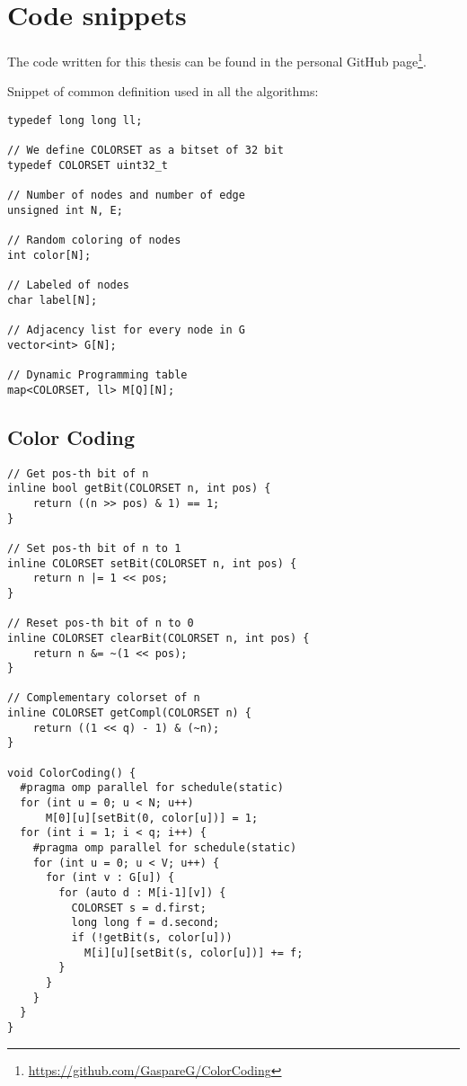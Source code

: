 

\chapter{Code snippets}
  
The code written for this thesis can be found in the personal GitHub page\footnote{\url{https://github.com/GaspareG/ColorCoding}}.\medskip

Snippet of common definition used in all the algorithms:

\begin{lstlisting}
typedef long long ll;

// We define COLORSET as a bitset of 32 bit
typedef COLORSET uint32_t

// Number of nodes and number of edge
unsigned int N, E;

// Random coloring of nodes
int color[N];

// Labeled of nodes
char label[N];

// Adjacency list for every node in G
vector<int> G[N];

// Dynamic Programming table
map<COLORSET, ll> M[Q][N];
\end{lstlisting}

\clearpage


\section*{Color Coding}

\begin{lstlisting}
// Get pos-th bit of n
inline bool getBit(COLORSET n, int pos) { 
	return ((n >> pos) & 1) == 1; 
}

// Set pos-th bit of n to 1
inline COLORSET setBit(COLORSET n, int pos) { 
	return n |= 1 << pos; 
}

// Reset pos-th bit of n to 0
inline COLORSET clearBit(COLORSET n, int pos) { 
	return n &= ~(1 << pos); 
}

// Complementary colorset of n
inline COLORSET getCompl(COLORSET n) { 
	return ((1 << q) - 1) & (~n); 
}

void ColorCoding() {
  #pragma omp parallel for schedule(static)
  for (int u = 0; u < N; u++) 
	  M[0][u][setBit(0, color[u])] = 1;
  for (int i = 1; i < q; i++) {
    #pragma omp parallel for schedule(static)
    for (int u = 0; u < V; u++) {
      for (int v : G[u]) {
        for (auto d : M[i-1][v]) {
          COLORSET s = d.first;
          long long f = d.second;
          if (!getBit(s, color[u]))
            M[i][u][setBit(s, color[u])] += f;
        }
      }
    }
  }
}
\end{lstlisting}


